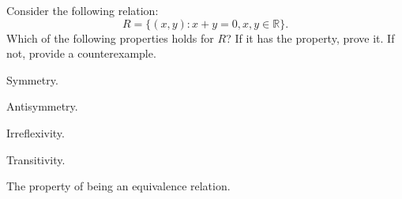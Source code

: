 \documentclass[12pt,twoside]{article}
\begin{document}
\begin{problem}{10}
Consider the following relation:
$$R = \{(x,y) : x+y=0, x,y \in \mathbb{R}\}.$$
Which of the following properties holds for $R$? If it has the property, prove it. If not, provide a counterexample.

\bparts

 Symmetry.

 Antisymmetry.

 Irreflexivity.

 Transitivity.


 The property of being an equivalence relation.

\eparts

\end{problem}
\end{document}
